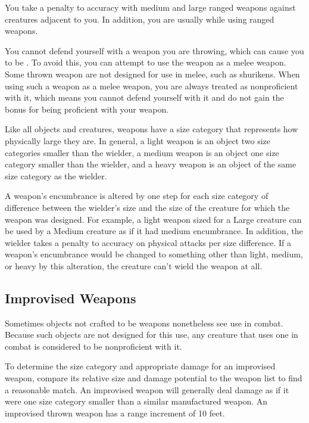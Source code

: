 You take a  penalty to accuracy with medium and large ranged weapons against creatures adjacent to you. In addition, you are usually  while using ranged weapons.

\label{Thrown Weapons in Melee} You cannot defend yourself with a weapon you are throwing, which can cause you to be . To avoid this, you can attempt to use the weapon as a melee weapon. Some thrown weapon are not designed for use in melee, such as shurikens. When using such a weapon as a melee weapon, you are always treated as nonproficient with it, which means you cannot defend yourself with it and do not gain the  bonus for being proficient with your weapon.

 Like all objects and creatures, weapons have a size category that represents how physically large they are. In general, a light weapon is an object two size categories smaller than the wielder, a medium weapon is an object one size category smaller than the wielder, and a heavy weapon is an object of the same size category as the wielder.

 A weapon's encumbrance is altered by one step for each size category of difference between the wielder's size and the size of the creature for which the weapon was designed. For example, a light weapon sized for a Large creature can be used by a Medium creature as if it had medium encumbrance. In addition, the wielder takes a  penalty to accuracy on physical attacks per size difference. If a weapon's encumbrance would be changed to something other than light, medium, or heavy by this alteration, the creature can't wield the weapon at all.

\subsection{Improvised Weapons} Sometimes objects not crafted to be weapons nonetheless see use in combat. Because such objects are not designed for this use, any creature that uses one in combat is considered to be nonproficient with it.

To determine the size category and appropriate damage for an improvised weapon, compare its relative size and damage potential to the weapon list to find a reasonable match. An improvised weapon will generally deal damage as if it were one size category smaller than a similar manufactured weapon. An improvised thrown weapon has a range increment of 10 feet.

